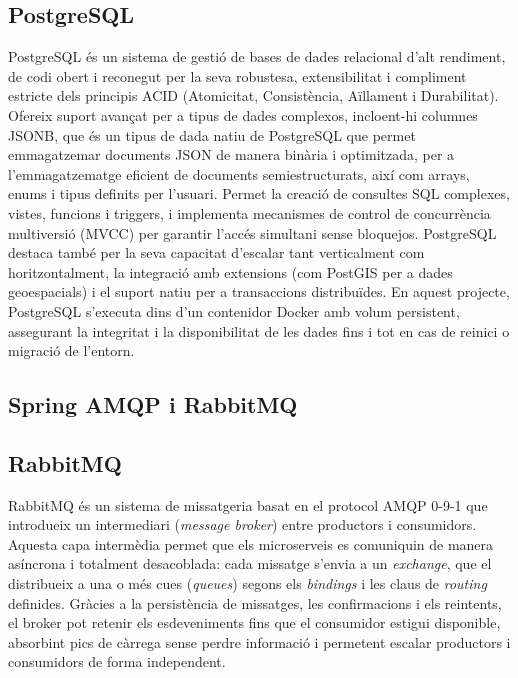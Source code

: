 \subsection*{PostgreSQL}
PostgreSQL és un sistema de gestió de bases de dades relacional d'alt rendiment, de codi obert i reconegut per la seva robustesa, extensibilitat i compliment estricte dels principis ACID (Atomicitat, Consistència, Aïllament i Durabilitat). Ofereix suport avançat per a tipus de dades complexos, incloent-hi columnes JSONB, que és un tipus de dada natiu de PostgreSQL que permet emmagatzemar documents JSON de manera binària i optimitzada, per a l'emmagatzematge eficient de documents semiestructurats, així com arrays, enums i tipus definits per l'usuari. Permet la creació de consultes SQL complexes, vistes, funcions i triggers, i implementa mecanismes de control de concurrència multiversió (MVCC) per garantir l'accés simultani sense bloquejos. PostgreSQL destaca també per la seva capacitat d'escalar tant verticalment com horitzontalment, la integració amb extensions (com PostGIS per a dades geoespacials) i el suport natiu per a transaccions distribuïdes. En aquest projecte, PostgreSQL s'executa dins d'un contenidor Docker amb volum persistent, assegurant la integritat i la disponibilitat de les dades fins i tot en cas de reinici o migració de l'entorn.

\subsection*{Spring AMQP i RabbitMQ}

\subsection*{RabbitMQ}

RabbitMQ és un sistema de missatgeria basat en el protocol AMQP 0-9-1 que introdueix un intermediari
(\emph{message broker}) entre productors i consumidors.  
Aquesta capa intermèdia permet que els microserveis es
comuniquin de manera asíncrona i totalment desacoblada: cada missatge s'envia a un \emph{exchange},
que el distribueix a una o més cues (\emph{queues}) segons els \emph{bindings} i les claus de \textit{routing}
definides.  
Gràcies a la persistència de missatges, les confirmacions i els reintents, el broker pot retenir
els esdeveniments fins que el consumidor estigui disponible, absorbint pics de càrrega sense perdre
informació i permetent escalar productors i consumidors de forma independent.

